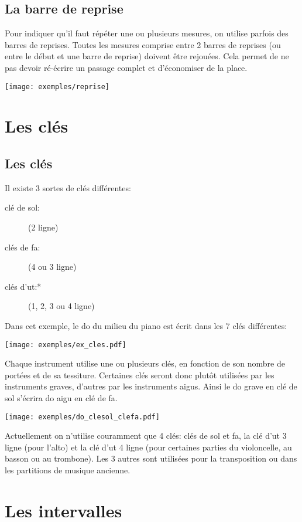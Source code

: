 \documentclass[11pt,a4paper]{scrreprt}
\begin{document}
\section{La barre de reprise}
Pour indiquer qu'il faut répéter une ou plusieurs mesures, on utilise parfois des barres de reprises. Toutes les mesures comprise entre 2 barres de reprises (ou entre le début et une barre de reprise) doivent être rejouées. Cela permet de ne pas devoir ré-écrire un passage complet et d'économiser de la place.

\texttt{[image: exemples/reprise]}

\chapter{Les clés}
\fancyfoot[CO]{\thepage}%
\section{Les clés}
Il existe 3 sortes de clés différentes: 
\begin{description}
\item [clé de sol:] (2\ieme{} ligne)
\item [clés de fa:] (4\ieme{} ou 3\ieme{} ligne)
\item  [clés d'ut:*] (1\iere, 2\ieme, 3\ieme{} ou 4\ieme{} ligne)
\end{description}
Dans cet exemple, le do du milieu du piano est écrit dans les 7 clés différentes:

\centerline{\texttt{[image: exemples/ex\_cles.pdf]}}

Chaque instrument utilise une ou plusieurs clés, en fonction de son nombre de portées et de sa tessiture. Certaines clés seront donc plutôt utilisées par les instruments graves, d'autres par les instruments aigus. Ainsi le do grave en clé de sol s'écrira do aigu en clé de fa.

\centerline{\texttt{[image: exemples/do\_clesol\_clefa.pdf]}}

Actuellement on n'utilise couramment que 4 clés: clés de sol et fa, la clé d'ut 3\ieme{} ligne (pour l'alto) et la clé d'ut 4\ieme{} ligne (pour certaines parties du violoncelle, au basson ou au trombone). Les 3 autres sont utilisées pour la transposition ou dans les partitions de musique ancienne.

\chapter{Les intervalles}
\end{document}
